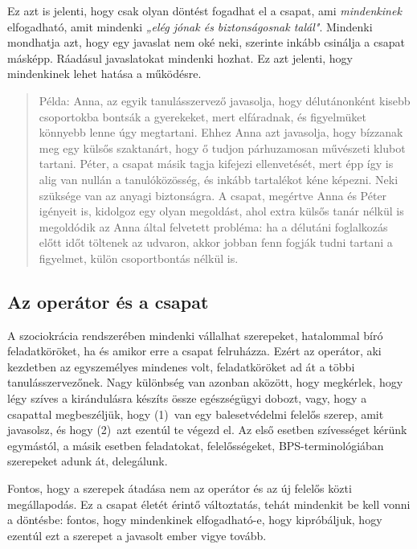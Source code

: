 Ez azt is jelenti, hogy csak olyan döntést fogadhat el a csapat, ami
\emph{mindenkinek} elfogadható, amit mindenki \emph{„elég jónak és
biztonságosnak talál"}. Mindenki mondhatja azt, hogy egy javaslat nem
oké neki, szerinte inkább csinálja a csapat másképp. Ráadásul
javaslatokat mindenki hozhat. Ez azt jelenti, hogy mindenkinek lehet
hatása a működésre.

\begin{quote}
Példa: Anna, az egyik tanulásszervező javasolja, hogy
délutánonként kisebb csoportokba bontsák a gyerekeket, mert elfáradnak,
és figyelmüket könnyebb lenne úgy megtartani. Ehhez Anna azt javasolja,
hogy bízzanak meg egy külsős szaktanárt, hogy ő tudjon párhuzamosan
művészeti klubot tartani. Péter, a csapat másik tagja kifejezi
ellenvetését, mert épp így is alig van nullán a tanulóközösség, és
inkább tartalékot kéne képezni. Neki szüksége van az anyagi biztonságra.
A csapat, megértve Anna és Péter igényeit is, kidolgoz egy olyan
megoldást, ahol extra külsős tanár nélkül is megoldódik az Anna által
felvetett probléma: ha a délutáni foglalkozás előtt időt töltenek az
udvaron, akkor jobban fenn fogják tudni tartani a figyelmet, külön
csoportbontás nélkül is.
\end{quote}

\hypertarget{az-operator-es-a-csapat}{%
\subsection{Az operátor és a csapat}\label{az-operator-es-a-csapat}}

A szociokrácia rendszerében mindenki vállalhat szerepeket, hatalommal
bíró feladatköröket, ha és amikor erre a csapat felruházza. Ezért az
operátor, aki kezdetben az egyszemélyes mindenes volt,
feladatköröket ad át a többi tanulásszervezőnek. Nagy különbség van
azonban aközött, hogy megkérlek, hogy légy szíves a kirándulásra készíts
össze egészségügyi dobozt, vagy, hogy a csapattal megbeszéljük, hogy
(1)~van
egy balesetvédelmi felelős szerep, amit javasolsz, és hogy (2)~azt ezentúl te
végezd el. Az első esetben szívességet kérünk egymástól, a másik esetben
feladatokat, felelősségeket, BPS-terminológiában szerepeket adunk át,
delegálunk.

Fontos, hogy a szerepek átadása nem az operátor és az új felelős közti
megállapodás. Ez a csapat életét érintő változtatás, tehát mindenkit be
kell vonni a döntésbe: fontos, hogy mindenkinek elfogadható-e, hogy
kipróbáljuk, hogy ezentúl ezt a szerepet a javasolt ember vigye tovább.

